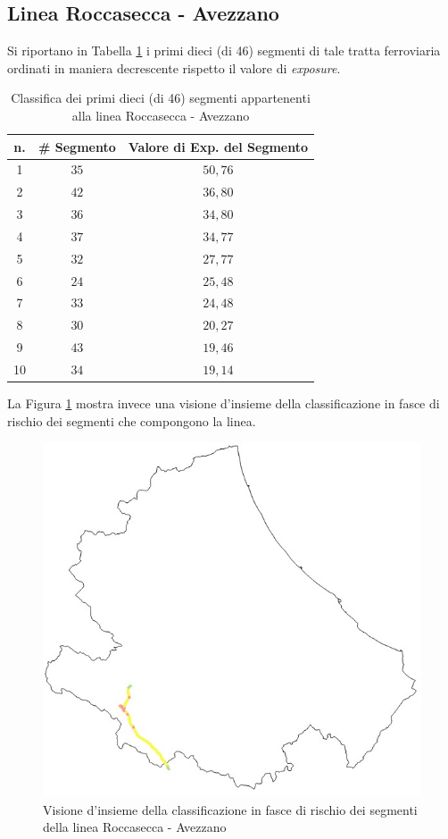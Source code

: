 \subsection{Linea Roccasecca - Avezzano}
Si riportano in Tabella \ref{classificaroccaseccaavezzano} i primi dieci (di 46) segmenti di tale tratta ferroviaria ordinati in maniera decrescente rispetto il valore di \textit{exposure}.
\begin{table}[hpt]
\centering
\begin{tabular}{|c|c|c|}
\hline
\rowcolor{lightgray}
n. & \# Segmento & Valore di Exp. del Segmento \\ \hline \rowcolor{flamingopink}
1  & $35$        & $50,76$                      \\ \hline \rowcolor{flamingopink}
2  & $42$        & $36,80$                      \\ \hline \rowcolor{flamingopink}
3  & $36$        & $34,80$                      \\ \hline \rowcolor{flamingopink}
4  & $37$        & $34,77$                      \\ \hline \rowcolor{flamingopink}
5  & $32$        & $27,77$                      \\ \hline \rowcolor{flamingopink}
6  & $24$        & $25,48$                      \\ \hline \rowcolor{flamingopink}
7  & $33$       & $24,48$                      \\ \hline \rowcolor{flamingopink}
8  & $30$        & $20,27$                      \\ \hline \rowcolor{icterine}
9  & $43$        & $19,46$                      \\ \hline \rowcolor{icterine}
10 & $34$        & $19,14$                      \\ \hline
\end{tabular}
\caption{Classifica dei primi dieci (di 46) segmenti appartenenti alla linea Roccasecca - Avezzano}
\label{classificaroccaseccaavezzano}
\end{table}
\newline
La Figura \ref{avezzanoroccasecca} mostra invece una visione d'insieme della classificazione in fasce di rischio dei segmenti che compongono la linea.
\begin{figure}[h]
\centering
\includegraphics[width=0.4\linewidth]{img/avezzanoroccasecca.jpeg}
\caption{Visione d'insieme della classificazione in fasce di rischio dei segmenti della linea Roccasecca - Avezzano}
\label{avezzanoroccasecca}
\end{figure}
